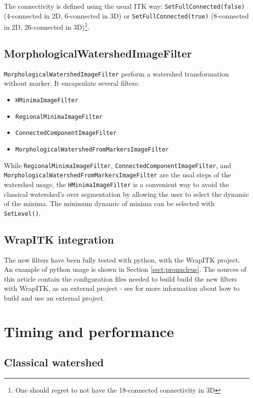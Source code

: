 \documentclass{InsightArticle}
\begin{document}
The connectivity is defined using the usual ITK way: \verb$SetFullConnected(false)$
(4-connected in 2D, 6-connected in 3D) or \verb$SetFullConnected(true)$ (8-connected
in 2D, 26-connected in 3D)\footnote{One should regret to not have the 18-connected
connectivity in 3D}.

  \subsection{MorphologicalWatershedImageFilter}

\verb$MorphologicalWatershedImageFilter$ perform a watershed transformation
without marker. It encapsulate several filters:
\begin{itemize}
  \item \verb$HMinimaImageFilter$
  \item \verb$RegionalMinimaImageFilter$
  \item \verb$ConnectedComponentImageFilter$
  \item \verb$MorphologicalWatershedFromMarkersImageFilter$
\end{itemize}
While \verb$RegionalMinimaImageFilter$, \verb$ConnectedComponentImageFilter$,
and \verb$MorphologicalWatershedFromMarkersImageFilter$ are the usal steps
of the watershed usage, the \verb$HMinimaImageFilter$ is a convenient way
to avoid the classical watershed's over segmentation by allowing the user
to select the dynamic of the minima. The minimum dynamic of minima can be
selected with \verb$SetLevel()$.

  \subsection{WrapITK integration}

The new filters have been fully tested with python, with the WrapITK project.
An example of python usage is shown in Section \ref{sect:pronucleus}.
The sources of this article contain the configuration files needed to build
build the new filters with WrapITK, as an external project - see \cite{WrapITK}
for more information about how to build and use an external project.

\section{Timing and performance}
\label{sect:perf}

  \subsection{Classical watershed}
\label{sect:perf-classical}
\end{document}
